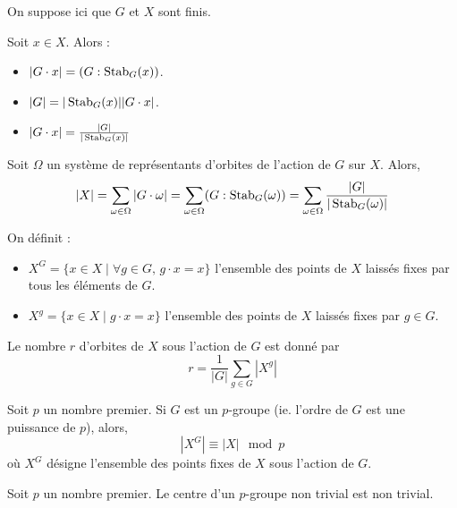   On suppose ici que $G$ et $X$ sont finis.


  \begin{proposition}
    Soit $x \in X$. Alors :
    \begin{itemize}
      \item $|G \cdot x| = (G : \operatorname{Stab}_G(x))$.
      \item $|G| = |\operatorname{Stab}_G(x)| |G \cdot x|$.
      \item $|G \cdot x| = \frac{|G|}{|\operatorname{Stab}_G(x)|}$
    \end{itemize}
  \end{proposition}

  \begin{theorem}
    Soit $\Omega$ un système de représentants d'orbites de l'action de $G$ sur $X$. Alors,
    \[ |X| = \sum_{\omega \in \Omega} |G \cdot \omega| = \sum_{\omega \in \Omega} (G : \operatorname{Stab}_G(\omega)) = \sum_{\omega \in \Omega} \frac{|G|}{|\operatorname{Stab}_G(\omega)|} \]
  \end{theorem}

  \begin{definition}
    On définit :
    \begin{itemize}
      \item $X^G = \{ x \in X \mid \forall g \in G, \, g \cdot x = x \}$ l'ensemble des points de $X$ laissés fixes par tous les éléments de $G$.
      \item $X^g = \{ x \in X \mid g \cdot x = x \}$ l'ensemble des points de $X$ laissés fixes par $g \in G$.
    \end{itemize}
  \end{definition}

  \begin{theorem}
    Le nombre $r$ d'orbites de $X$ sous l'action de $G$ est donné par
    \[ r = \frac{1}{|G|} \sum_{g \in G} |X^g| \]
  \end{theorem}

  \begin{corollary}
    Soit $p$ un nombre premier. Si $G$ est un $p$-groupe (ie. l'ordre de $G$ est une puissance de $p$), alors,
    \[ |X^G| \equiv |X| \mod p \]
    où $X^G$ désigne l'ensemble des points fixes de $X$ sous l'action de $G$.
  \end{corollary}

  \begin{corollary}
    Soit $p$ un nombre premier. Le centre d'un $p$-groupe non trivial est non trivial.
  \end{corollary}

